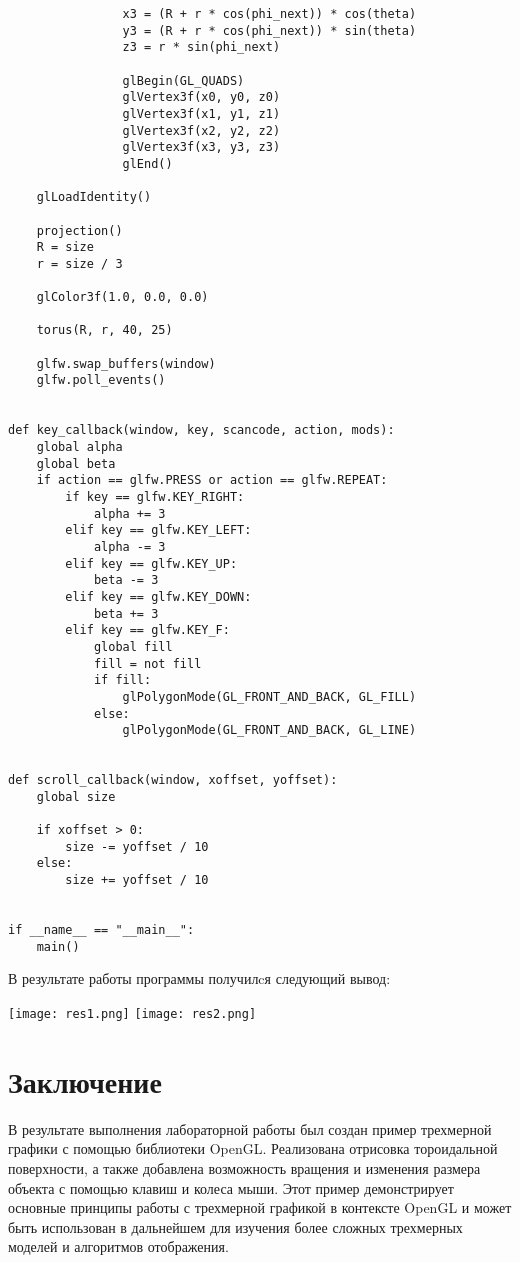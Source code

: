 \documentclass[a4paper, 14pt]{extarticle}
\begin{document}
\begin{lstlisting}
                x3 = (R + r * cos(phi_next)) * cos(theta)
                y3 = (R + r * cos(phi_next)) * sin(theta)
                z3 = r * sin(phi_next)

                glBegin(GL_QUADS)
                glVertex3f(x0, y0, z0)
                glVertex3f(x1, y1, z1)
                glVertex3f(x2, y2, z2)
                glVertex3f(x3, y3, z3)
                glEnd()

    glLoadIdentity()

    projection()
    R = size
    r = size / 3

    glColor3f(1.0, 0.0, 0.0)

    torus(R, r, 40, 25)

    glfw.swap_buffers(window)
    glfw.poll_events()


def key_callback(window, key, scancode, action, mods):
    global alpha
    global beta
    if action == glfw.PRESS or action == glfw.REPEAT:
        if key == glfw.KEY_RIGHT:
            alpha += 3
        elif key == glfw.KEY_LEFT:
            alpha -= 3
        elif key == glfw.KEY_UP:
            beta -= 3
        elif key == glfw.KEY_DOWN:
            beta += 3
        elif key == glfw.KEY_F:
            global fill
            fill = not fill
            if fill:
                glPolygonMode(GL_FRONT_AND_BACK, GL_FILL)
            else:
                glPolygonMode(GL_FRONT_AND_BACK, GL_LINE)


def scroll_callback(window, xoffset, yoffset):
    global size

    if xoffset > 0:
        size -= yoffset / 10
    else:
        size += yoffset / 10


if __name__ == "__main__":
    main()

\end{lstlisting}
В результате работы программы получилcя следующий вывод:
\begin{center}
    \texttt{[image: res1.png]}
    \newpage
    \texttt{[image: res2.png]}
\end{center}
\pagebreak

\section{Заключение}
В результате выполнения лабораторной работы был создан пример трехмерной графики с помощью библиотеки OpenGL. Реализована отрисовка тороидальной поверхности, а также добавлена возможность вращения и изменения размера объекта с помощью клавиш и колеса мыши. Этот пример демонстрирует основные принципы работы с трехмерной графикой в контексте OpenGL и может быть использован в дальнейшем для изучения более сложных трехмерных моделей и алгоритмов отображения.
\end{document}
